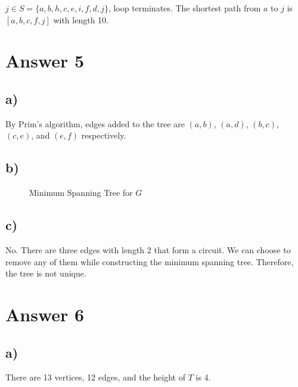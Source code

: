 \documentclass[12pt]{article}
\begin{document}
$j \in S = \{a, b, h, c, e, i, f, d, j\}$, loop terminates. The shortest path from $a$ to $j$ is $[a, b, c, f, j]$ with length 10.

\section*{Answer 5}

\subsection*{a)}
By Prim's algorithm, edges added to the tree are $(a, b)$, $(a, d)$, $(b, c)$, $(c, e)$, and $(e, f)$ respectively.

\subsection*{b)}
\begin{figure}[H]
	\centering
	\caption{Minimum Spanning Tree for $G$}
	\label{fig:minspantree}
\end{figure}

\subsection*{c)}
No. There are three edges with length 2 that form a circuit. We can choose to remove any of them while constructing the minimum spanning tree. Therefore, the tree is not unique.

\section*{Answer 6}

\subsection*{a)}
There are 13 vertices, 12 edges, and the height of $T$ is 4.
\end{document}

